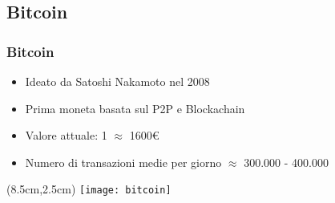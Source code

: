 \subsection{Bitcoin}
\begin{frame}
 \frametitle{Bitcoin}

 \begin{itemize}
  \item<1-> Ideato da Satoshi Nakamoto nel 2008
  \item<2-> Prima moneta basata sul P2P e Blockachain%
  \item<3-> Valore attuale: 1\bitcoin{} $ \approx $  1600\euro{}
  \item<4-> Numero di transazioni medie per giorno $ \approx $ 300.000 - 400.000
 \end{itemize}



 \begin{textblock*}{5cm}(8.5cm,2.5cm)
  \texttt{[image: bitcoin]}
 \end{textblock*}

\end{frame}

